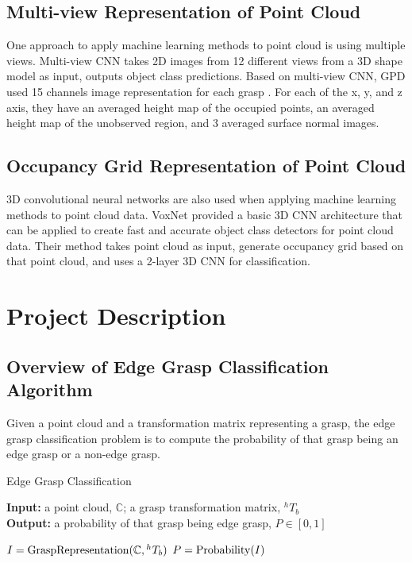 \documentclass[letterpaper]{article} %
\begin{document}
\subsection{Multi-view Representation of Point Cloud}
One approach to apply machine learning methods to point cloud is using multiple views. Multi-view CNN \cite{RN7} takes 2D images from 12 different views from a 3D shape model as input, outputs object class predictions.
Based on multi-view CNN, GPD used 15 channels image representation for each grasp \cite{RN6}. For each of the x, y, and z axis, they have an averaged height map of the occupied points, an averaged height map of the unobserved region, and 3 averaged surface normal images.

\subsection{Occupancy Grid Representation of Point Cloud}
3D convolutional neural networks are also used when applying machine learning methods to point cloud data. VoxNet \cite{RN4} provided a basic 3D CNN architecture that can be applied to create fast and accurate object class detectors for point cloud data. Their method takes point cloud as input, generate occupancy grid based on that point cloud, and uses a 2-layer 3D CNN for classification.

\section{Project Description}
\subsection{Overview of Edge Grasp Classification Algorithm}
Given a point cloud and a transformation matrix representing a grasp, the edge grasp classification problem is to compute the probability of that grasp being an edge grasp or a non-edge grasp.

\begin{algorithm}[H]
\caption{Edge Grasp Classification}
\textbf{Input:} a point cloud, $\mathbb{C}$; a grasp transformation matrix, ${^h}T_b$ \\
\textbf{Output:} a probability of that grasp being edge grasp, $P\in [0, 1]$ \\
\begin{algorithmic}[1]
\STATE $I={\rm GraspRepresentation}(\mathbb{C}, {^h}T_b)$
\STATE $P={\rm Probability}(I)$
\end{algorithmic}
\end{algorithm}
\end{document}
